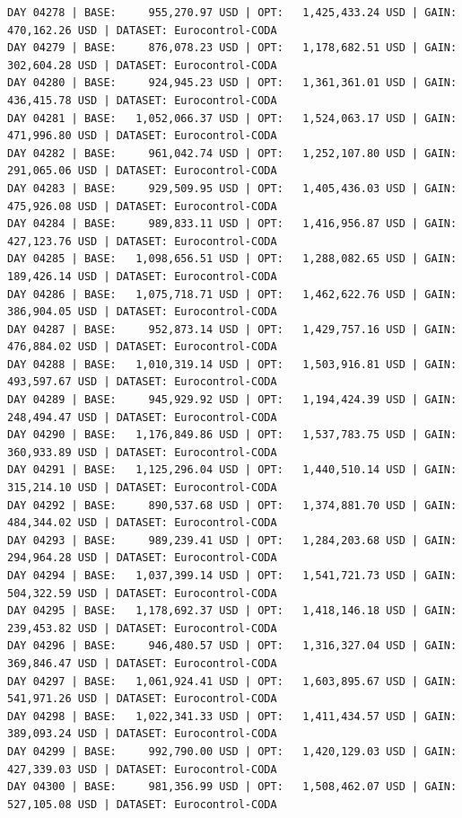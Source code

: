 \documentclass[11pt,a4paper]{article}
\begin{document}
\begin{verbatim}
DAY 04278 | BASE:     955,270.97 USD | OPT:   1,425,433.24 USD | GAIN: 470,162.26 USD | DATASET: Eurocontrol-CODA
DAY 04279 | BASE:     876,078.23 USD | OPT:   1,178,682.51 USD | GAIN: 302,604.28 USD | DATASET: Eurocontrol-CODA
DAY 04280 | BASE:     924,945.23 USD | OPT:   1,361,361.01 USD | GAIN: 436,415.78 USD | DATASET: Eurocontrol-CODA
DAY 04281 | BASE:   1,052,066.37 USD | OPT:   1,524,063.17 USD | GAIN: 471,996.80 USD | DATASET: Eurocontrol-CODA
DAY 04282 | BASE:     961,042.74 USD | OPT:   1,252,107.80 USD | GAIN: 291,065.06 USD | DATASET: Eurocontrol-CODA
DAY 04283 | BASE:     929,509.95 USD | OPT:   1,405,436.03 USD | GAIN: 475,926.08 USD | DATASET: Eurocontrol-CODA
DAY 04284 | BASE:     989,833.11 USD | OPT:   1,416,956.87 USD | GAIN: 427,123.76 USD | DATASET: Eurocontrol-CODA
DAY 04285 | BASE:   1,098,656.51 USD | OPT:   1,288,082.65 USD | GAIN: 189,426.14 USD | DATASET: Eurocontrol-CODA
DAY 04286 | BASE:   1,075,718.71 USD | OPT:   1,462,622.76 USD | GAIN: 386,904.05 USD | DATASET: Eurocontrol-CODA
DAY 04287 | BASE:     952,873.14 USD | OPT:   1,429,757.16 USD | GAIN: 476,884.02 USD | DATASET: Eurocontrol-CODA
DAY 04288 | BASE:   1,010,319.14 USD | OPT:   1,503,916.81 USD | GAIN: 493,597.67 USD | DATASET: Eurocontrol-CODA
DAY 04289 | BASE:     945,929.92 USD | OPT:   1,194,424.39 USD | GAIN: 248,494.47 USD | DATASET: Eurocontrol-CODA
DAY 04290 | BASE:   1,176,849.86 USD | OPT:   1,537,783.75 USD | GAIN: 360,933.89 USD | DATASET: Eurocontrol-CODA
DAY 04291 | BASE:   1,125,296.04 USD | OPT:   1,440,510.14 USD | GAIN: 315,214.10 USD | DATASET: Eurocontrol-CODA
DAY 04292 | BASE:     890,537.68 USD | OPT:   1,374,881.70 USD | GAIN: 484,344.02 USD | DATASET: Eurocontrol-CODA
DAY 04293 | BASE:     989,239.41 USD | OPT:   1,284,203.68 USD | GAIN: 294,964.28 USD | DATASET: Eurocontrol-CODA
DAY 04294 | BASE:   1,037,399.14 USD | OPT:   1,541,721.73 USD | GAIN: 504,322.59 USD | DATASET: Eurocontrol-CODA
DAY 04295 | BASE:   1,178,692.37 USD | OPT:   1,418,146.18 USD | GAIN: 239,453.82 USD | DATASET: Eurocontrol-CODA
DAY 04296 | BASE:     946,480.57 USD | OPT:   1,316,327.04 USD | GAIN: 369,846.47 USD | DATASET: Eurocontrol-CODA
DAY 04297 | BASE:   1,061,924.41 USD | OPT:   1,603,895.67 USD | GAIN: 541,971.26 USD | DATASET: Eurocontrol-CODA
DAY 04298 | BASE:   1,022,341.33 USD | OPT:   1,411,434.57 USD | GAIN: 389,093.24 USD | DATASET: Eurocontrol-CODA
DAY 04299 | BASE:     992,790.00 USD | OPT:   1,420,129.03 USD | GAIN: 427,339.03 USD | DATASET: Eurocontrol-CODA
DAY 04300 | BASE:     981,356.99 USD | OPT:   1,508,462.07 USD | GAIN: 527,105.08 USD | DATASET: Eurocontrol-CODA

\end{verbatim}
\end{document}
